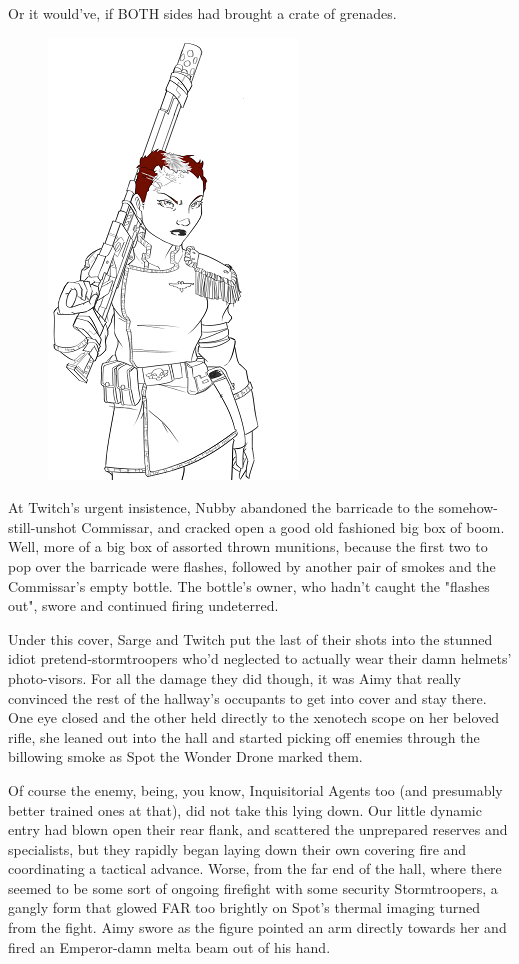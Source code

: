 Or it would've, if BOTH sides had brought a crate of grenades.

\begin{figure}
	\begin{center}
		\includegraphics[width=\figwidth]{pics/21/105.png}
	\end{center}
\end{figure}
At Twitch's urgent insistence, Nubby abandoned the barricade to the somehow-still-unshot Commissar, and cracked open a good old fashioned big box of boom. 
Well, more of a big box of assorted thrown munitions, because the first two to pop over the barricade were flashes, followed by another pair of smokes and the Commissar's empty bottle. 
The bottle's owner, who hadn't caught the "flashes out", swore and continued firing undeterred.

Under this cover, Sarge and Twitch put the last of their shots into the stunned idiot pretend-stormtroopers who'd neglected to actually wear their damn helmets' photo-visors. 
For all the damage they did though, it was Aimy that really convinced the rest of the hallway's occupants to get into cover and stay there. 
One eye closed and the other held directly to the xenotech scope on her beloved rifle, she leaned out into the hall and started picking off enemies through the billowing smoke as Spot the Wonder Drone marked them. 


Of course the enemy, being, you know, Inquisitorial Agents too (and presumably better trained ones at that), did not take this lying down. 
Our little dynamic entry had blown open their rear flank, and scattered the unprepared reserves and specialists, but they rapidly began laying down their own covering fire and coordinating a tactical advance. 
Worse, from the far end of the hall, where there seemed to be some sort of ongoing firefight with some security Stormtroopers, a gangly form that glowed FAR too brightly on Spot's thermal imaging turned from the fight. 
Aimy swore as the figure pointed an arm directly towards her and fired an Emperor-damn melta beam out of his hand.

